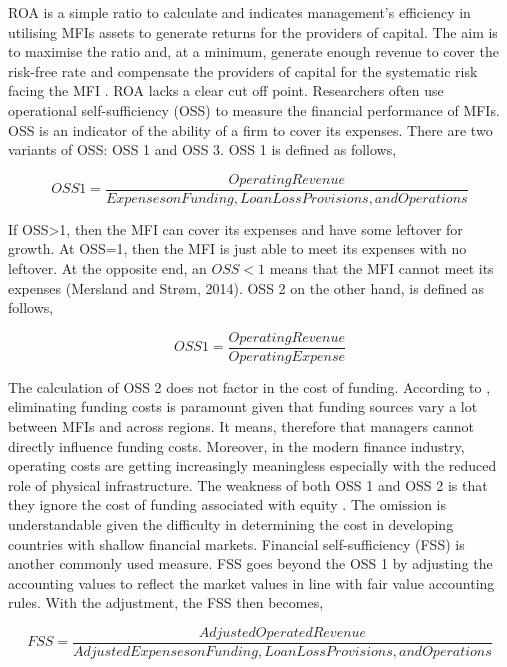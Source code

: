 \documentclass[a4paper, nobind]{templates/ociamthesis}
\begin{document}
ROA is a simple ratio to calculate and indicates management's efficiency in utilising MFIs assets to generate returns for the providers of capital. The aim is to maximise the ratio and, at a minimum, generate enough revenue to cover the risk-free rate and compensate the providers of capital for the systematic risk facing the MFI \autocite{mersland2014microfinance}. ROA lacks a clear cut off point. Researchers often use operational self-sufficiency (OSS) to measure the financial performance of MFIs. OSS is an indicator of the ability of a firm to cover its expenses. There are two variants of OSS: OSS 1 and OSS 3. OSS 1 is defined as follows,

\begin{equation}
OSS1 = \frac{Operating Revenue}{Expenses on Funding, Loan Loss Provisions, and Operations}
\end{equation}

If OSS\textgreater1, then the MFI can cover its expenses and have some leftover for growth. At OSS=1, then the MFI is just able to meet its expenses with no leftover. At the opposite end, an \(OSS < 1\) means that the MFI cannot meet its expenses (Mersland and Strøm, 2014).
OSS 2 on the other hand, is defined as follows,

\begin{equation}
OSS1 = \frac{Operating Revenue}{Operating Expense}
\end{equation}

The calculation of OSS 2 does not factor in the cost of funding. According to \textcite{mersland2014microfinance}, eliminating funding costs is paramount given that funding sources vary a lot between MFIs and across regions. It means, therefore that managers cannot directly influence funding costs. Moreover, in the modern finance industry, operating costs are getting increasingly meaningless especially with the reduced role of physical infrastructure. The weakness of both OSS 1 and OSS 2 is that they ignore the cost of funding associated with equity \autocite{mersland2014microfinance}. The omission is understandable given the difficulty in determining the cost in developing countries with shallow financial markets. Financial self-sufficiency (FSS) is another commonly used measure. FSS goes beyond the OSS 1 by adjusting the accounting values to reflect the market values in line with fair value accounting rules. With the adjustment, the FSS then becomes,

\begin{equation}
FSS = \frac{Adjusted Operated Revenue}{Adjusted Expenses on Funding, Loan Loss Provisions, and Operations}
\end{equation}
\end{document}
